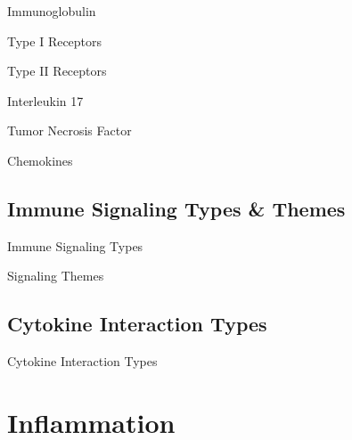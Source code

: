 \documentclass[10pt]{article}
\begin{document}
    \begin{core}{Immunoglobulin}

    \end{core}

    \begin{core}{Type I Receptors}

    \end{core}

    \begin{core}{Type II Receptors}

    \end{core}

    \begin{core}{Interleukin 17}

    \end{core}

    \begin{core}{Tumor Necrosis Factor}

    \end{core}

    \begin{core}{Chemokines}

    \end{core}

  \subsection{Immune Signaling Types \& Themes}

    \begin{core}{Immune Signaling Types}

    \end{core}

    \begin{core}{Signaling Themes}

    \end{core}

  \subsection{Cytokine Interaction Types}

    \begin{core}{Cytokine Interaction Types}

    \end{core}


\section{Inflammation}
  \label{sec:inflammation}
\end{document}

